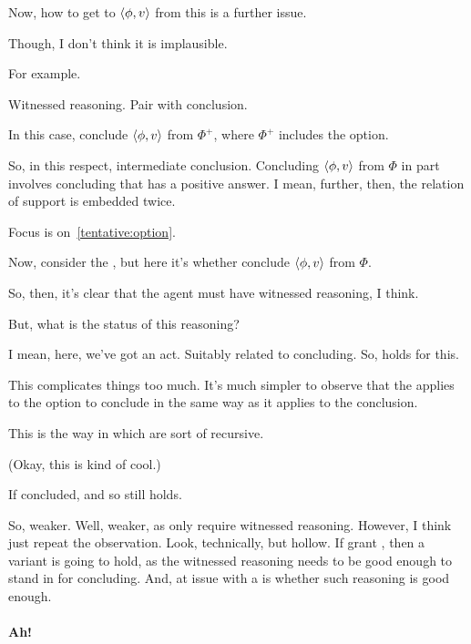 \begin{note}
  Now, how to get to \(\langle \phi, v \rangle\) from this is a further issue.

  Though, I don't think it is implausible.

  For example.

  Witnessed reasoning.
  Pair with conclusion.

  In this case, conclude \(\langle \phi, v \rangle\) from \(\Phi^{+}\), where \(\Phi^{+}\) includes the option.

  So, in this respect, intermediate conclusion.
  Concluding \(\langle \phi, v \rangle\) from \(\Phi\) in part involves concluding that \qzS{} has a positive answer.
  I mean, further, then, the relation of support is embedded twice.
\end{note}

\begin{note}
  Focus is on~\ref{tentative:option}.
\end{note}

\begin{note}
  Now, consider the \requ{}, but here it's whether conclude \(\langle \phi, v \rangle\) from \(\Phi\).

  So, then, it's clear that the agent must have witnessed reasoning, I think.

  But, what is the status of this reasoning?

  I mean, here, we've got an act.
  Suitably related to concluding.
  So, \requ{} holds for this.

  {
    \color{red}
    This complicates things too much.
    It's much simpler to observe that the \requ{} applies to the option to conclude in the same way as it applies to the conclusion.

    This is the way in which  are sort of recursive.
  }

  (Okay, this is kind of cool.)

  If concluded, and so \requ{} still holds.

  So, weaker.
  Well, weaker, as only require witnessed reasoning.
  However, I think just repeat the observation.
  Look, technically, but hollow.
  If grant \requ{}, then a variant is going to hold, as the witnessed reasoning needs to be good enough to stand in for concluding.
  And, at issue with a \requ{} is whether such reasoning is good enough.
\end{note}

\paragraph{Ah!}

